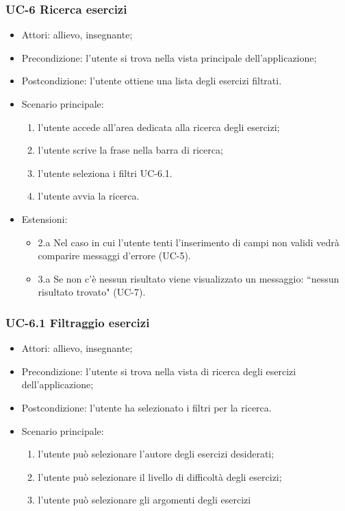 \subsubsection{UC-6 Ricerca esercizi}
		\begin{itemize}
			\item Attori: allievo, insegnante;
			\item Precondizione: l'utente si trova nella vista principale dell'applicazione;
			\item Postcondizione: l'utente ottiene una lista degli esercizi filtrati.
			\item Scenario principale:
				\begin{enumerate}
					\item l'utente accede all'area dedicata alla ricerca degli esercizi;
					\item l'utente scrive la frase nella barra di ricerca;
					\item l'utente seleziona i filtri UC-6.1.
					\item l'utente avvia la ricerca.
				\end{enumerate}
			\item Estensioni:
				\begin{itemize}
					\item 2.a Nel caso in cui l'utente tenti l'inserimento di campi non validi vedrà comparire messaggi d'errore (UC-5).
					\item 3.a Se non c'è nessun risultato viene visualizzato un messaggio: ``nessun risultato trovato" (UC-7).
				\end{itemize}
		\end{itemize}
\subsubsection{UC-6.1 Filtraggio esercizi }
\begin{itemize}
\item Attori: allievo, insegnante;
			\item Precondizione: l'utente si trova nella vista di ricerca degli esercizi dell'applicazione;
			\item Postcondizione: l'utente ha selezionato i filtri per la ricerca.
			\item Scenario principale:
				\begin{enumerate}
					\item l'utente può selezionare l'autore degli esercizi desiderati;
					\item l'utente può selezionare il livello di difficoltà degli esercizi;
					\item l'utente può selezionare gli argomenti degli esercizi
				\end{enumerate}

\end{itemize}
